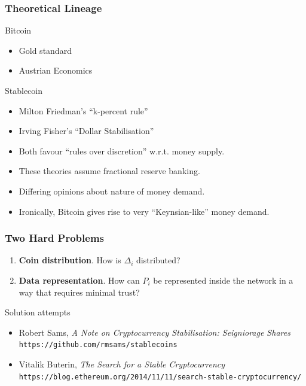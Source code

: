 \documentclass{beamer}
\begin{document}
\begin{frame}
  \frametitle{Theoretical Lineage}

  \begin{block}{Bitcoin}
    \begin{itemize}
    \item Gold standard
    \item Austrian Economics  
    \end{itemize}
  \end{block}

  \begin{block}{Stablecoin}
    \begin{itemize}
    \item Milton Friedman's ``k-percent rule''
    \item Irving Fisher's ``Dollar Stabilisation''
    \end{itemize}
  \end{block}

  \begin{itemize}
  \item Both favour ``rules over discretion'' w.r.t. money
    supply.
  \item These theories assume fractional reserve banking.
  \item Differing opinions about nature of money demand.
  \item Ironically, Bitcoin gives rise to very ``Keynsian-like'' money
    demand.
  \end{itemize}
  
\end{frame}

\begin{frame}
  \frametitle{Two Hard Problems}
  \begin{enumerate}
  \item \textbf{Coin distribution}. How is $\Delta_{i}$ distributed?
  \item \textbf{Data representation}. How can $P_{i}$ be represented
    inside the network in a way that requires minimal trust?
  \end{enumerate}

  \begin{block}{Solution attempts}
    \begin{itemize}
    \item Robert Sams, \emph{A Note on Cryptocurrency Stabilisation: Seigniorage Shares}\\
      \texttt{https://github.com/rmsams/stablecoins}
    \item Vitalik Buterin, \emph{The Search for a Stable Cryptocurrency}\\
      \texttt{https://blog.ethereum.org/2014/11/11/search-stable-cryptocurrency/}
    \end{itemize}
  \end{block}

\end{frame}
\end{document}
